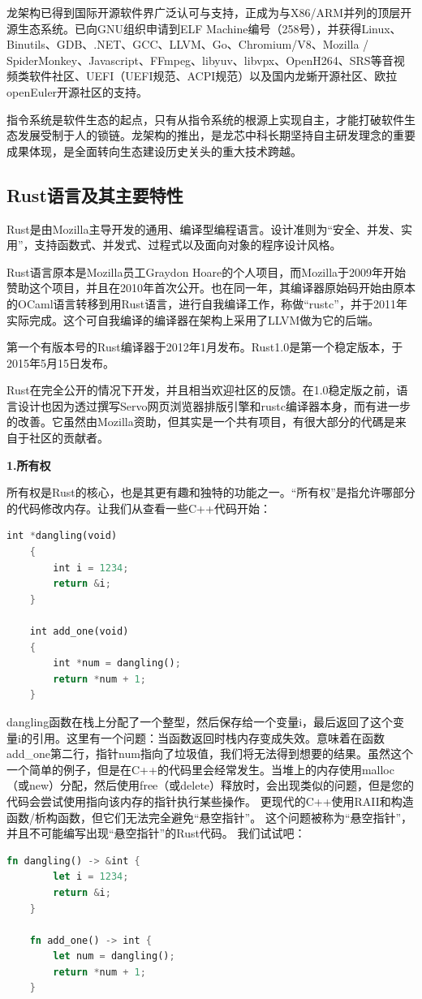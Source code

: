 龙架构已得到国际开源软件界广泛认可与支持，正成为与X86/ARM并列的顶层开源生态系统。已向GNU组织申请到ELF Machine编号（258号），并获得Linux、Binutils、GDB、.NET、GCC、LLVM、Go、Chromium/V8、Mozilla / SpiderMonkey、Javascript、FFmpeg、libyuv、libvpx、OpenH264、SRS等音视频类软件社区、UEFI（UEFI规范、ACPI规范）以及国内龙蜥开源社区、欧拉openEuler开源社区的支持。

指令系统是软件生态的起点，只有从指令系统的根源上实现自主，才能打破软件生态发展受制于人的锁链。龙架构的推出，是龙芯中科长期坚持自主研发理念的重要成果体现，是全面转向生态建设历史关头的重大技术跨越。

\subsection{Rust语言及其主要特性}
Rust是由Mozilla主导开发的通用、编译型编程语言。设计准则为“安全、并发、实用”，支持函数式、并发式、过程式以及面向对象的程序设计风格。

Rust语言原本是Mozilla员工Graydon Hoare的个人项目，而Mozilla于2009年开始赞助这个项目，并且在2010年首次公开。也在同一年，其编译器原始码开始由原本的OCaml语言转移到用Rust语言，进行自我编译工作，称做“rustc”，并于2011年实际完成。这个可自我编译的编译器在架构上采用了LLVM做为它的后端。

第一个有版本号的Rust编译器于2012年1月发布。Rust1.0是第一个稳定版本，于2015年5月15日发布。

Rust在完全公开的情况下开发，并且相当欢迎社区的反馈。在1.0稳定版之前，语言设计也因为透过撰写Servo网页浏览器排版引擎和rustc编译器本身，而有进一步的改善。它虽然由Mozilla资助，但其实是一个共有项目，有很大部分的代碼是来自于社区的贡献者。

\textbf{1.所有权}

所有权是Rust的核心，也是其更有趣和独特的功能之一。“所有权”是指允许哪部分的代码修改内存。让我们从查看一些C++代码开始：
\begin{lstlisting}[language={Rust}, label={code:forktest},
	caption={forktest.rs}]
	int *dangling(void)
	{
		int i = 1234;
		return &i;
	}
	
	int add_one(void)
	{
		int *num = dangling();
		return *num + 1;
	}
\end{lstlisting}

dangling函数在栈上分配了一个整型，然后保存给一个变量i，最后返回了这个变量i的引用。这里有一个问题：当函数返回时栈内存变成失效。意味着在函数add\_one第二行，指针num指向了垃圾值，我们将无法得到想要的结果。虽然这个一个简单的例子，但是在C++的代码里会经常发生。当堆上的内存使用malloc（或new）分配，然后使用free（或delete）释放时，会出现类似的问题，但是您的代码会尝试使用指向该内存的指针执行某些操作。 更现代的C++使用RAII和构造函数/析构函数，但它们无法完全避免“悬空指针”。 这个问题被称为“悬空指针”，并且不可能编写出现“悬空指针”的Rust代码。 我们试试吧：
\begin{lstlisting}[language={Rust}, label={code:forktest},
	caption={forktest.rs}]
	fn dangling() -> &int {
		let i = 1234;
		return &i;
	}
	
	fn add_one() -> int {
		let num = dangling();
		return *num + 1;
	}
\end{lstlisting}

